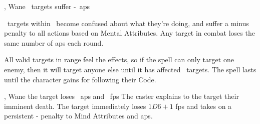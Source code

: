   {\mWater, \mFate}%
  {Wane}%
  {\duplicated}%
  {}%
  {\spellArea\ targets suffer -~\glspl{ap}}%
  {
    \spellArea\ targets within \spellRange\ become confused about what they're doing, and suffer a minus  penalty to all actions based on Mental Attributes.
    Any target in combat loses the same number of \glspl{ap} each round.

    All valid targets in range feel the effects, so if the spell can only target one enemy, then it will target anyone else until it has affected \spellArea\ targets.
    The spell lasts until the character gains  for following their Code.
  }

  {\mWater, \mFate}%
  {Wane}%
  {\divergent}%
  {}%
  {the target loses ~\glspl{ap} and \rollConv~\glspl{fp}}%
  {
    The caster explains to the target their imminent death.
    The target immediately loses $1D6+1$ \glspl{fp} and takes on a persistent - penalty to Mind Attributes and \glspl{ap}.
  }
